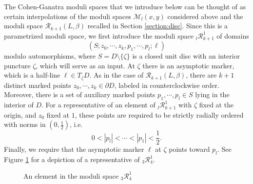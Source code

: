 \documentclass[a4paper]{article}
\numberwithin{equation}{section}
\begin{document}
The Cohen-Ganatra moduli spaces that we introduce below can be thought of as certain interpolations of the moduli spaces $\mathcal{M}_l(x,y)$ considered above and the moduli space $\mathcal{R}_{k+1}(L,\beta)$ recalled in Section \ref{section:disc}. Since this is a parametrized moduli space, we first introduce the moduli space ${}_l\mathcal{R}_{k+1}^1$ of domains
\begin{equation}\label{eq:domain}
(S;z_0,\cdots,z_k,p_1,\cdots,p_l;\ell)
\end{equation}
modulo automorphisms, where $S=D\setminus\{\zeta\}$ is a closed unit disc with an interior puncture $\zeta$, which will serve as an input. At $\zeta$ there is an asymptotic marker, which is a half-line $\ell\in T_\zeta D$. As in the case of $\mathcal{R}_{k+1}(L,\beta)$, there are $k+1$ distinct marked points $z_0,\cdots,z_k\in\partial D$, labeled in counterclockwise order. Moreover, there is a set of auxiliary marked points $p_1,\cdots,p_l\in S$ lying in the interior of $D$. For a representative of an element of ${}_l\mathcal{R}_{k+1}^1$ with $\zeta$ fixed at the origin, and $z_0$ fixed at $1$, these points are required to be strictly radially ordered with norms in $(0,\frac{1}{2})$, i.e.
\begin{equation}\label{eq:radial}
0<|p_l|<\cdots<|p_1|<\frac{1}{2}.
\end{equation}
Finally, we require that the asymptotic marker $\ell$ at $\zeta$ points toward $p_l$. See Figure \ref{fig:domain} for a depiction of a representative of ${}_3\mathcal{R}_4^1$.

\begin{figure}
    \centering
	\caption{An element in the moduli space ${}_3\mathcal{R}_4^1$}
	\label{fig:domain}
\end{figure}
\end{document}
